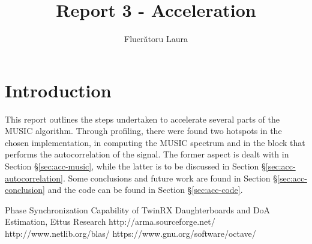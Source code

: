 \documentclass[12pt, a4paper, oneside, romanian]{article}
\begin{document}
\title{Report 3 - Acceleration}
\author{Fluerătoru Laura}
\date{}
\maketitle

\section{Introduction}

This report outlines the steps undertaken to accelerate several parts of the
MUSIC algorithm. Through profiling, there were found two hotspots in the chosen
implementation, in computing the MUSIC spectrum and in the block that performs
the autocorrelation of the signal. The former aspect is dealt with in Section
\S\ref{sec:acc-music}, while the latter is to be discussed in Section
\S\ref{sec:acc-autocorrelation}. Some conclusions and future work are found in
Section \S\ref{sec:acc-conclusion} and the code can be found in Section
\S\ref{sec:acc-code}.






\begin{thebibliography}{1}
     Phase Synchronization Capability of TwinRX
    Daughterboards and DoA Estimation, Ettus Research
     http://arma.sourceforge.net/ 
     http://www.netlib.org/blas/
     https://www.gnu.org/software/octave/
\end{thebibliography}
\end{document}
